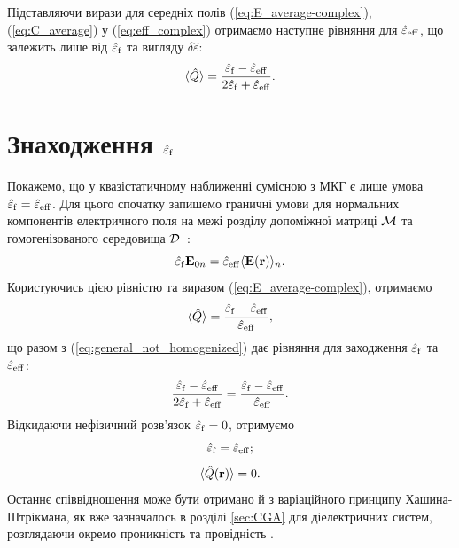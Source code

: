 \documentclass[14pt,twoside]{vakthesis}
\begin{document}
Підставляючи вирази для середніх полів (\ref{eq:E_average-complex}), 
(\ref{eq:C_average}) у (\ref{eq:eff_complex}) отримаємо наступне 
рівняння для $\hat{\varepsilon}_{\rm eff}$, що залежить лише від 
$\hat{\varepsilon}_{\rm f}$ та вигляду $\delta\hat{\varepsilon}$:
\begin{equation}\label{eq:general_not_homogenized}
\langle \hat{Q} \rangle = \frac{\hat{\varepsilon}_{\rm f} - \hat{\varepsilon}_{\rm eff}}{2\hat{\varepsilon}_{\rm f} + \hat{\varepsilon}_{\rm eff}}.
\end{equation}


\section{Знаходження $\hat{\varepsilon}_{\rm f}$}\label{sec:eps-f}

Покажемо, що у квазістатичному наближенні сумісною з МКГ є лише умова $\hat{\varepsilon}_{\rm f} = \hat{\varepsilon}_{\rm eff}$.
Для цього спочатку запишемо граничні умови для нормальних компонентів електричного поля на межі розділу допоміжної матриці $\cal{M}$ та гомогенізованого середовища $\cal D$~\cite{Sillars1937}:
\begin{equation}\label{eq:boundary}
\hat{\varepsilon}_{\rm f} {\bf E}_{0n} = \hat{\varepsilon}_{\rm eff} \langle {\bf E}({\bf r}) \rangle_{n}.
\end{equation}
Користуючись цією рівністю та виразом (\ref{eq:E_average-complex}), отримаємо 
\begin{equation}\label{eq:system_for_homog}
\langle \hat{Q} \rangle = \frac{\hat{\varepsilon}_{\rm f} - \hat{\varepsilon}_{\rm eff}}{\hat{\varepsilon}_{\rm eff}},
\end{equation}
що разом з (\ref{eq:general_not_homogenized}) дає рівняння для
заходження $\hat{\varepsilon}_{\rm f}$ та $\hat{\varepsilon}_{\rm eff}$:
\begin{equation}
	\frac{\hat{\varepsilon}_{\rm f} - \hat{\varepsilon}_{\rm eff}}{2\hat{\varepsilon}_{\rm f} + \hat{\varepsilon}_{\rm eff}} = \frac{\hat{\varepsilon}_{\rm f} - \hat{\varepsilon}_{\rm eff}}{\hat{\varepsilon}_{\rm eff}}.
\end{equation}
Відкидаючи нефізичний розв'язок 
$\hat{\varepsilon}_{\rm f} = 0$, отримуємо
\begin{equation}\label{eq:homog}
\hat{\varepsilon}_{\rm f} = \hat{\varepsilon}_{\rm eff};
\end{equation}
\begin{equation}\label{eq:general_Q}
\langle \hat{Q} ({\bf r}) \rangle = 0.
\end{equation}
Останнє співвідношення може бути отримано й з варіаційного принципу Ха\-шина-Штрік\-мана, як вже зазначалось в розділі \ref{sec:CGA} для діелектричних систем, розглядаючи окремо проникність та провідність \cite{Sushko2017, Torquato1991}.
\end{document}
